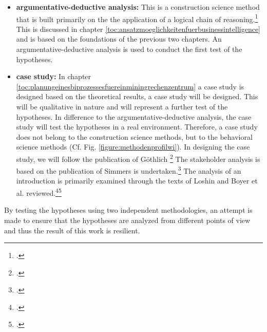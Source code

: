 \begin{itemize}
    \item \textbf{argumentative-deductive analysis: }This is a construction science method that is built primarily on the
    the application of a logical chain of reasoning.\footcite[Cf.][Tbl. 1]{wilde2007forschungsmethoden} This is discussed in chapter
    \ref{toc:ansatzmoeglichkeitenfuerbusinessintelligence} and is based on the foundations of the previous two chapters.
    An argumentative-deductive analysis is used to conduct the first test of the hypotheses. 
    \item \textbf{case study: }In chapter \ref{toc:planungeinesbiprozessesfuereinminingrechenzentrum} a case study is designed based on the theoretical
    results, a case study will be designed. This will be qualitative in nature and will represent a further test of the hypotheses. In
    difference to the argumentative-deductive analysis, the case study will test the hypotheses in a real environment.
    Therefore, a case study does not belong to the construction science methods, but to the behavioral science methods
    (Cf. Fig. \ref{figure:methodenprofilwi}). In designing the case study, we will follow the publication of Göthlich
    \footcite[Cf.][]{gothlich2003fallstudien} The stakeholder analysis is based on the publication of Simmers
    is undertaken.\footcite[Cf.][]{simmers2004stakeholder} The analysis of an introduction is primarily examined through the texts of Loshin and
    Boyer et al. reviewed.\footcite[Cf.][]{loshin2012business}\footcite[Cf.][]{boyer2010business}
\end{itemize} 

By testing the hypotheses using two independent methodologies, an attempt is made to ensure that the hypotheses are analyzed from different points of view
and thus the result of this work is resilient.
